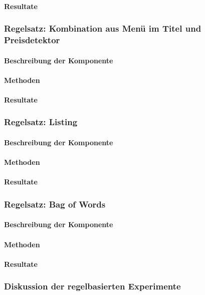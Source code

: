 \paragraph{Resultate}
\subsubsection{Regelsatz: Kombination aus Menü im Titel und Preisdetektor}
\paragraph{Beschreibung der Komponente}
\paragraph{Methoden}
\paragraph{Resultate}
\subsubsection{Regelsatz: Listing}
\paragraph{Beschreibung der Komponente}
\paragraph{Methoden}
\paragraph{Resultate}
\subsubsection{Regelsatz: Bag of Words}
\paragraph{Beschreibung der Komponente}
\paragraph{Methoden}
\paragraph{Resultate}
\subsubsection{Diskussion der regelbasierten Experimente}

